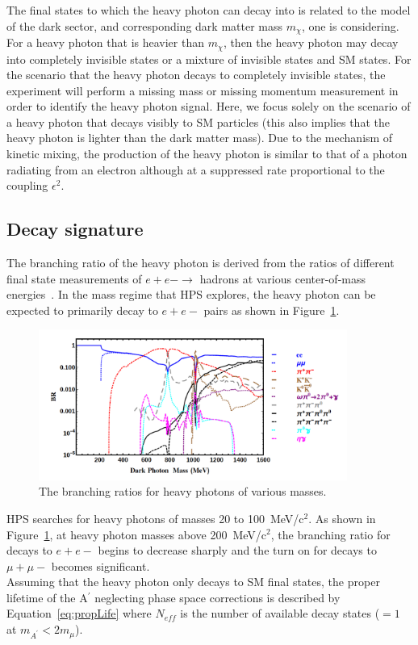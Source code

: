 The final states to which the heavy photon can decay into is related to the model of the dark sector, and corresponding dark matter mass $m_{\chi}$, one is considering. For a heavy photon that is heavier than $m_{\chi}$, then the heavy photon may decay into completely invisible states or a mixture of invisible states and SM states. For the scenario that the heavy photon decays to completely invisible states, the experiment will perform a missing mass or missing momentum measurement in order to identify the heavy photon signal. Here, we focus solely on the scenario of a heavy photon that decays visibly to SM particles (this also implies that the heavy photon is lighter than the dark matter mass). Due to the mechanism of kinetic mixing, the production of the heavy photon is similar to that of a photon radiating from an electron although at a suppressed rate proportional to the coupling $\epsilon^2$. 

\subsection{Decay signature}
The branching ratio of the heavy photon is derived from the ratios of different final state measurements of $e+e-\rightarrow$ hadrons at various center-of-mass energies~\cite{weiner}. In the mass regime that HPS explores, the heavy photon can be expected to primarily decay to $e+e-$ pairs as shown in Figure~\ref{Figure:br}. 

\begin{figure}[H]
  \centering
      \includegraphics[width=0.9\textwidth]{pics/motivation/branchingRatio.png}
  \caption[The branching ratios for heavy photon decays]{The branching ratios for heavy photons of various masses.~\cite{weiner}}
  \label{Figure:br}
\end{figure}

HPS searches for heavy photons of masses 20 to 100~MeV/c$^2$. As shown in Figure~\ref{Figure:br}, at heavy photon masses above 200~MeV/c$^2$, the branching ratio for decays to $e+e-$ begins to decrease sharply and the turn on for decays to $\mu+\mu-$ becomes significant. \\
\indent Assuming that the heavy photon only decays to SM final states, the proper lifetime of the A$^{\prime}$ neglecting phase space corrections is described by Equation~\eqref{eq:propLife} where $N_{eff}$ is the number of available decay states ($=1$ at $m_{A^{\prime}}<2m_{\mu}$).~\cite{toro} 

